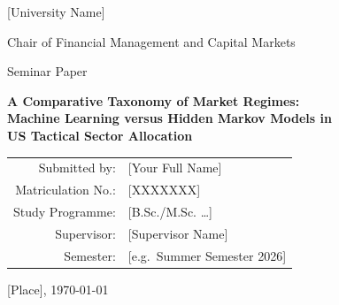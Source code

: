 \documentclass[12pt,a4paper]{article}
\begin{document}
\begin{titlepage}
\centering
{\large [University Name]\par}
{\large Chair of Financial Management and Capital Markets\par}
\vspace{1.2cm}
{\large Seminar Paper\par}
\vspace{2.2cm}
{\Large\bfseries A Comparative Taxonomy of Market Regimes:\\[0.3em]
Machine Learning versus Hidden Markov Models in\\[0.3em]
US Tactical Sector Allocation\par}
\vspace{2.2cm}
\begin{tabular}{rl}
Submitted by:        & [Your Full Name]\\
Matriculation No.:   & [XXXXXXX]\\
Study Programme:     & [B.Sc./M.Sc. \ldots]\\
Supervisor:          & [Supervisor Name]\\
Semester:            & [e.g.\ Summer Semester 2026]\\
\end{tabular}
\vfill
{\normalsize [Place], \today\par}
\end{titlepage}


\tableofcontents
\clearpage

\listoffigures
\clearpage

\listoftables
\clearpage

\end{document}
